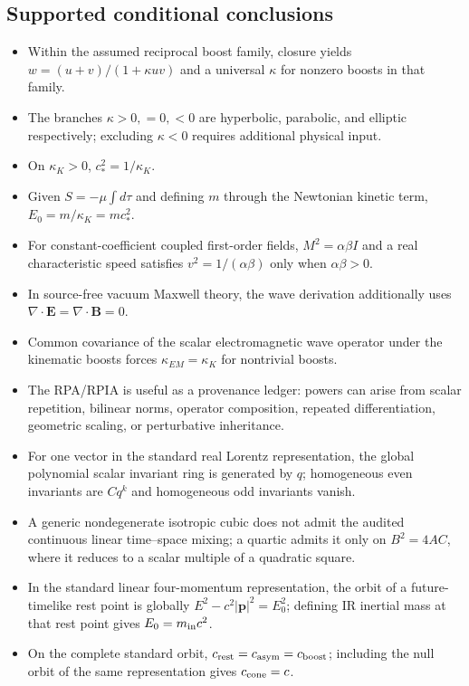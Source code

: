 \documentclass[11pt,a4paper]{article}
\begin{document}
\subsection{Supported conditional conclusions}
\begin{itemize}
\item Within the assumed reciprocal boost family, closure yields $w=(u+v)/(1+\kappa uv)$ and a universal $\kappa$ for nonzero boosts in that family.
\item The branches $\kappa>0,=0,<0$ are hyperbolic, parabolic, and elliptic respectively; excluding $\kappa<0$ requires additional physical input.
\item On $\kappa_K>0$, $c_*^2=1/\kappa_K$.
\item Given $S=-\mu\int d\tau$ and defining $m$ through the Newtonian kinetic term, $E_0=m/\kappa_K=mc_*^2$.
\item For constant-coefficient coupled first-order fields, $M^2=\alpha\beta I$ and a real characteristic speed satisfies $v^2=1/(\alpha\beta)$ only when $\alpha\beta>0$.
\item In source-free vacuum Maxwell theory, the wave derivation additionally uses $\nabla\cdot\mathbf E=\nabla\cdot\mathbf B=0$.
\item Common covariance of the scalar electromagnetic wave operator under the kinematic boosts forces $\kappa_{EM}=\kappa_K$ for nontrivial boosts.
\item The RPA/RPIA is useful as a provenance ledger: powers can arise from scalar repetition, bilinear norms, operator composition, repeated differentiation, geometric scaling, or perturbative inheritance.
\item For one vector in the standard real Lorentz representation, the global polynomial scalar invariant ring is generated by $q$; homogeneous even invariants are $Cq^k$ and homogeneous odd invariants vanish.
\item A generic nondegenerate isotropic cubic does not admit the audited continuous linear time--space mixing; a quartic admits it only on $B^2=4AC$, where it reduces to a scalar multiple of a quadratic square.
\item In the standard linear four-momentum representation, the orbit of a future-timelike rest point is globally $E^2-c^2|\mathbf p|^2=E_0^2$; defining IR inertial mass at that rest point gives $E_0=m_{\rm in}c^2$.
\item On the complete standard orbit, $c_{\rm rest}=c_{\rm asym}=c_{\rm boost}$; including the null orbit of the same representation gives $c_{\rm cone}=c$.

\end{itemize}
\end{document}
